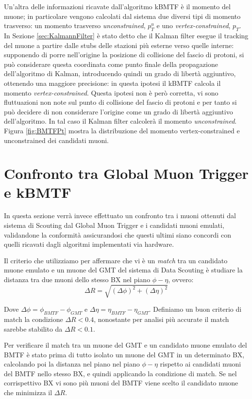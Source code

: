 Un'altra delle informazioni ricavate dall'algoritmo kBMTF è il momento del muone; in particolare vengono calcolati dal sistema due diversi tipi di momento trasverso: un momento trasverso \textit{unconstrained}, $p_T^u$ e uno \textit{vertex-constrained}, $p_T$. In Sezione \ref{sec:KalmannFilter} è stato detto che il Kalman filter esegue il tracking del muone a partire dalle stubs delle stazioni più esterne verso quelle interne: supponendo di porre nell'origine la posizione di collisione del fascio di protoni, si può considerare questa coordinata come punto finale della propagazione dell'algoritmo di Kalman, introducendo quindi un grado di libertà aggiuntivo, ottenendo una maggiore precisione: in questa ipotesi il kBMTF calcola il momento \textit{vertex-constrained}. \newline
Questa ipotesi non è però corretta, vi sono fluttuazioni non note sul punto di collisione del fascio di protoni e per tanto si può decidere di non considerare l'origine come un grado di libertà aggiuntivo dell'algoritmo. In tal caso il Kalman filter calcolerà il momento \textit{unconstrained}. 
Figura \ref{fig:BMTFPt} mostra la distribuzione del momento vertex-constrained e unconstrained dei candidati muoni.


\section{Confronto tra Global Muon Trigger e kBMTF}
In questa sezione verrà invece effettuato un confronto tra i muoni ottenuti dal sistema di Scouting dal Global Muon Trigger e i candidati muoni emulati, validandone la conformità assicurandosi che questi ultimi siano concordi con quelli ricavati dagli algoritmi implementati via hardware. 

Il criterio che utilizziamo per affermare che vi è un \textit{match} tra un candidato muone emulato e un muone del GMT del sistema di Data Scouting è studiare la distanza tra due muoni dello stesso BX nel piano $\phi - \eta$, ovvero:
\begin{equation}
  \label{eq:DeltaR}
  \Delta R = \sqrt{(\Delta \phi)^2 + (\Delta \eta)^2}
\end{equation}

Dove $\Delta \phi = \phi_{BMTF} - \phi_{GMT}$ e $\Delta \eta = \eta_{BMTF} - \eta_{GMT}$. Definiamo un buon criterio di match la condizione $\Delta R < 0.4$, nonostante per analisi più accurate il match sarebbe stabilito da $\Delta R < 0.1$.

Per verificare il match tra un muone del GMT e un candidato muone emulato del BMTF è stato prima di tutto isolato un muone del GMT in un determinato BX, calcolando poi la distanza nel piano nel piano $\phi - \eta$ rispetto ai candidati muoni del BMTF nello stesso BX, e quindi applicando la condizione di match. Se nel corrispettivo BX vi sono più muoni del BMTF viene scelto il candidato muone che minimizza il $\Delta R$.


